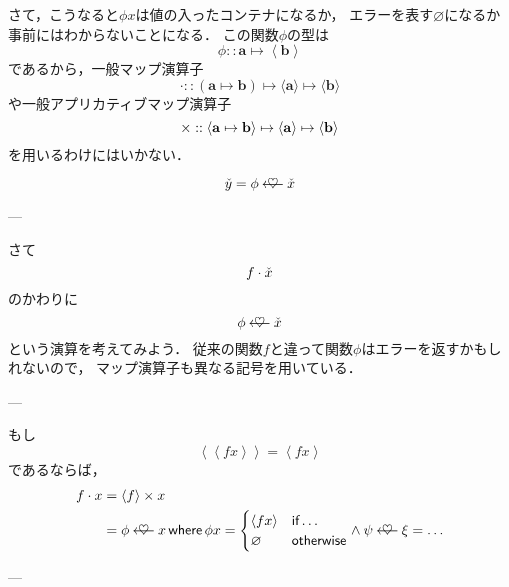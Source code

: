 \documentclass[a5paper,draft]{jsbook}
\newcommand{\mathTypeParameter}[1]{\mathbf{#1}}
\newcommand{\mathContainerVar}[1]{\Check{#1}}
\newcommand{\mathPureWith}[1]{\left\langle#1\right\rangle}
\newcommand{\mathUnitWith}[1]{\left\langle\!\left\langle#1\right\rangle\!\right\rangle}
\newcommand{\mathPureNothing}{\varnothing}
\newcommand{\mathAnd}{\mathbin{\wedge}}
\newcommand{\mathApplicativeGeneralMap}{\mathbin{\times}}
\newcommand{\mathBind}{\mathbin{\ooalign{$\longleftarrow$\crcr\hss$\heartsuit$\hss}}}
\newcommand{\mathGeneralMap}{\mathbin{\cdot}}
\newcommand{\mathIn}{\mathrel{::}}
\newcommand{\mathMapsTo}{\mapsto}
\newcommand{\mathKeyword}[1]{\operatorname{\textsf{#1}}}
\newcommand{\mathIf}{\mathKeyword{if}}
\newcommand{\mathOtherwise}{\mathKeyword{otherwise}}
\newcommand{\mathWhere}{\mathKeyword{where}}
\newcommand{\mathMorph}[2]{#1\mathMapsTo#2}
\newcommand{\mathMorphII}[3]{#1\mathMapsTo#2\mathMapsTo#3}
\begin{document}
さて，こうなると$\phi x$は値の入ったコンテナになるか，
エラーを表す$\mathPureNothing$になるか事前にはわからないことになる．
この関数$\phi$の型は
\begin{equation}
  \phi\mathIn\mathTypeParameter{a}\mathMapsTo\mathPureWith{\mathTypeParameter{b}}
\end{equation}
であるから，一般マップ演算子
\begin{equation}
\mathGeneralMap
\mathIn{}\mathMorphII{(\mathMorph{\mathTypeParameter{a}}{\mathTypeParameter{b}})}{\langle\mathTypeParameter{a}\rangle}{\langle\mathTypeParameter{b}\rangle}
\end{equation}
や一般アプリカティブマップ演算子
\begin{equation}
\mathApplicativeGeneralMap
\mathIn{}\mathMorphII{\langle\mathMorph{\mathTypeParameter{a}}{\mathTypeParameter{b}}\rangle}{\langle\mathTypeParameter{a}\rangle}{\langle\mathTypeParameter{b}\rangle}\\
\end{equation}
を用いるわけにはいかない．

\begin{equation}
  \mathContainerVar{y}=\phi\mathBind\mathContainerVar{x}
\end{equation}

---

さて
\begin{equation}
  f\mathGeneralMap\mathContainerVar{x}
\end{equation}
のかわりに
\begin{equation}
  \phi\mathBind\mathContainerVar{x}
\end{equation}
という演算を考えてみよう．
従来の関数$f$と違って関数$\phi$はエラーを返すかもしれないので，
マップ演算子も異なる記号を用いている．

---

もし
\begin{equation}
\mathUnitWith{fx}=\mathPureWith{fx}
\end{equation}
であるならば，
\begin{align}
f\mathGeneralMap x&=\mathPureWith{f}\mathApplicativeGeneralMap x\\
&=\phi\mathBind x\mathWhere \phi x=\begin{cases}
\mathPureWith{fx}&\mathIf\dots\\
\mathPureNothing&\mathOtherwise
\end{cases}
\mathAnd
\psi\mathBind\xi=\dots
\end{align}


---
\end{document}
